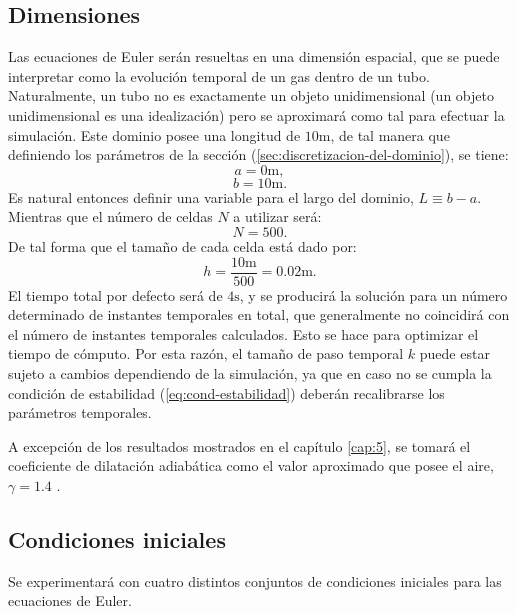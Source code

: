 \subsection{Dimensiones}
\label{sec:dimensiones}
Las ecuaciones de Euler serán resueltas en una dimensión espacial, que se puede interpretar como la evolución temporal de un gas dentro de un tubo. Naturalmente, un tubo no es exactamente un objeto unidimensional (un objeto unidimensional es una idealización) pero se aproximará como tal para efectuar la simulación. Este dominio posee una longitud de $10\unit{\meter}$, de tal manera que definiendo los parámetros de la sección (\ref{sec:discretizacion-del-dominio}), se tiene:
\begin{equation}
	a = 0 \unit{\meter},
\end{equation}
\begin{equation}
	b = 10 \unit{\meter}.
\end{equation}
Es natural entonces definir una variable para el largo del dominio, $L\equiv b-a$. Mientras que el número de celdas $N$ a utilizar será:
\begin{equation}
	N = 500.
\end{equation}
De tal forma que el tamaño de cada celda está dado por:
\begin{equation}
	h = \frac{10\unit{\meter}}{500} = 0.02 \unit{\meter}.
\end{equation}
El tiempo total por defecto será de $4\unit{\second}$, y se producirá la solución para un número determinado de instantes temporales en total, que generalmente no coincidirá con el número de instantes temporales calculados. Esto se hace para optimizar el tiempo de cómputo. Por esta razón, el tamaño de paso temporal $k$ puede estar sujeto a cambios dependiendo de la simulación, ya que en caso no se cumpla la condición de estabilidad (\ref{eq:cond-estabilidad}) deberán recalibrarse los parámetros temporales.

A excepción de los resultados mostrados en el capítulo \ref{cap:5}, se tomará el coeficiente de dilatación adiabática como el valor aproximado que posee el aire, $\gamma = 1.4$ \cite{LeVeque}.

\subsection{Condiciones iniciales}
Se experimentará con cuatro distintos conjuntos de condiciones iniciales para las ecuaciones de Euler. 

